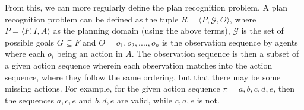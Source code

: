 From this, we can more regularly define the plan recognition problem. A plan recognition
problem can be defined as the tuple $R = \langle P, \mathcal{G}, O \rangle$, where
$P = \langle F, I, A \rangle$ as the planning domain (using the above terms),
$\mathcal{G}$ is the set of possible goals $G \subseteq F$ and
$O = o_{1}, o_{2}, ...., o_{n}$ is the observation sequence by agents where each
$o_{i}$ being an action in $A$. The observation sequence is then a subset
of a given action sequence wherein each observation matches into the action
sequence, where they follow the same ordering, but that there may be some missing
actions. For example, for the given action sequence $\pi = {a,b,c,d,e}$, then
the sequences ${a,c,e}$ and ${b,d,e}$ are valid, while ${c,a,e}$ is not.